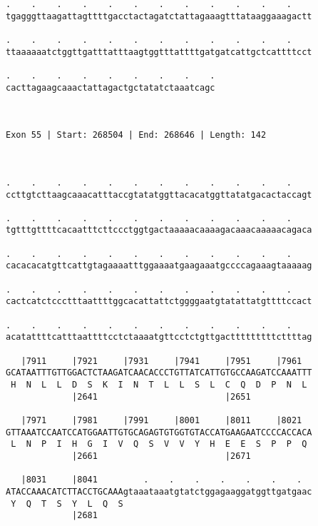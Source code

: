 \documentclass{article}
\begin{document}
\begin{Verbatim}
.    .    .    .    .    .    .    .    .    .    .    .    
tgagggttaagattagttttgacctactagatctattagaaagtttataaggaaagactt
                                                            
.    .    .    .    .    .    .    .    .    .    .    .    
ttaaaaaatctggttgatttatttaagtggtttattttgatgatcattgctcattttcct
                                                            
.    .    .    .    .    .    .    .    .
cacttagaagcaaactattagactgctatatctaaatcagc
                                         
                                         
 
Exon 55 | Start: 268504 | End: 268646 | Length: 142



.    .    .    .    .    .    .    .    .    .    .    .    
ccttgtcttaagcaaacatttaccgtatatggttacacatggttatatgacactaccagt
                                                            
.    .    .    .    .    .    .    .    .    .    .    .    
tgtttgttttcacaatttcttccctggtgactaaaaacaaaagacaaacaaaaacagaca
                                                            
.    .    .    .    .    .    .    .    .    .    .    .    
cacacacatgttcattgtagaaaatttggaaaatgaagaaatgccccagaaagtaaaaag
                                                            
.    .    .    .    .    .    .    .    .    .    .    .    
cactcatctccctttaattttggcacattattctggggaatgtatattatgttttccact
                                                            
.    .    .    .    .    .    .    .    .    .    .    .    
acatattttcatttaattttcctctaaaatgttcctctgttgactttttttttcttttag
                                                            
   |7911     |7921     |7931     |7941     |7951     |7961  
GCATAATTTGTTGGACTCTAAGATCAACACCCTGTTATCATTGTGCCAAGATCCAAATTT
 H  N  L  L  D  S  K  I  N  T  L  L  S  L  C  Q  D  P  N  L 
             |2641                         |2651            
  
   |7971     |7981     |7991     |8001     |8011     |8021  
GTTAAATCCAATCCATGGAATTGTGCAGAGTGTGGTGTACCATGAAGAATCCCCACCACA
 L  N  P  I  H  G  I  V  Q  S  V  V  Y  H  E  E  S  P  P  Q 
             |2661                         |2671            
  
   |8031     |8041         .    .    .    .    .    .    .  
ATACCAAACATCTTACCTGCAAAgtaaataaatgtatctggagaaggatggttgatgaac
 Y  Q  T  S  Y  L  Q  S                                     
             |2681                                          
  

\end{Verbatim}
\end{document}
